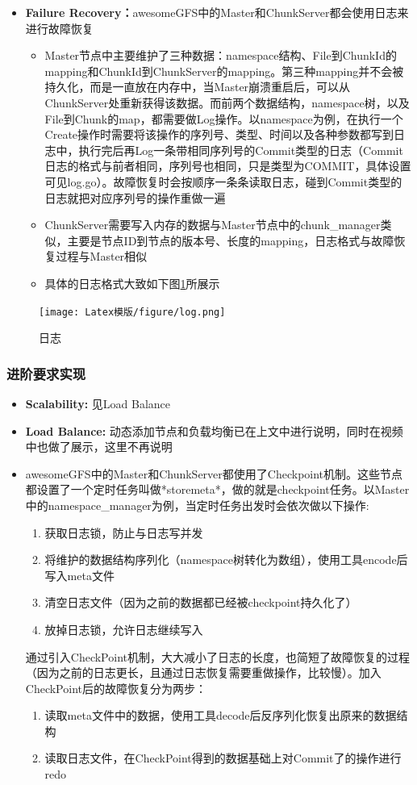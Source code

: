 \documentclass[UTF8]{ctexart}
\begin{document}
\begin{itemize}
\item \textbf{Failure Recovery：}awesomeGFS中的Master和ChunkServer都会使用日志来进行故障恢复 
    \begin{itemize}
        \item Master节点中主要维护了三种数据：namespace结构、File到ChunkId的mapping和ChunkId到ChunkServer的mapping。第三种mapping并不会被持久化，而是一直放在内存中，当Master崩溃重启后，可以从ChunkServer处重新获得该数据。而前两个数据结构，namespace树，以及File到Chunk的map，都需要做Log操作。以namespace为例，在执行一个Create操作时需要将该操作的序列号、类型、时间以及各种参数都写到日志中，执行完后再Log一条带相同序列号的Commit类型的日志（Commit日志的格式与前者相同，序列号也相同，只是类型为COMMIT，具体设置可见log.go）。故障恢复时会按顺序一条条读取日志，碰到Commit类型的日志就把对应序列号的操作重做一遍
        \item ChunkServer需要写入内存的数据与Master节点中的chunk\_manager类似，主要是节点ID到节点的版本号、长度的mapping，日志格式与故障恢复过程与Master相似
        \item 具体的日志格式大致如下图\ref{fig:日志}所展示
    \end{itemize}
\end{itemize}
\begin{figure}[h]
    \centering
    \texttt{[image: Latex模版/figure/log.png]}
	\caption{日志}
	\label{fig:日志}
\end{figure}
\subsubsection{进阶要求实现}
\begin{itemize}
        \item \textbf{Scalability:} 见Load Balance
        \item \textbf{Load Balance:} 动态添加节点和负载均衡已在上文中进行说明，同时在视频中也做了展示，这里不再说明
        \item awesomeGFS中的Master和ChunkServer都使用了Checkpoint机制。这些节点都设置了一个定时任务叫做*storemeta*，做的就是checkpoint任务。以Master中的namespace\_manager为例，当定时任务出发时会依次做以下操作:
        \begin{enumerate}
            \item 获取日志锁，防止与日志写并发
            \item 将维护的数据结构序列化（namespace树转化为数组），使用工具encode后写入meta文件
            \item 清空日志文件（因为之前的数据都已经被checkpoint持久化了）
            \item 放掉日志锁，允许日志继续写入
        \end{enumerate}
        通过引入CheckPoint机制，大大减小了日志的长度，也简短了故障恢复的过程（因为之前的日志更长，且通过日志恢复需要重做操作，比较慢）。加入CheckPoint后的故障恢复分为两步：
        \begin{enumerate}
            \item 读取meta文件中的数据，使用工具decode后反序列化恢复出原来的数据结构
            \item 读取日志文件，在CheckPoint得到的数据基础上对Commit了的操作进行redo
        \end{enumerate}
    \end{itemize}
\end{document}
